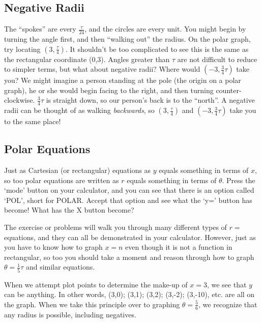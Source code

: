 
\subsection{Negative Radii}
The ``spokes'' are every $\frac{\tau}{24}$, and the circles are every unit.  You might begin by turning
the angle first, and then ``walking out'' the radius.  On the polar graph, try locating $(3,\frac{\tau}{4})$.
It shouldn't be too complicated to see this is the same as the rectangular coordinate (0,3).  Angles
greater than $\tau$ are not difficult to reduce to simpler terms, but what about negative radii?  
Where would $(-3,\frac{3}{4}\tau)$ take you?  We might imagine a person standing at the
pole (the origin on a polar graph), he or she would begin facing to the right, and then turning 
counter-clockwise.  $\frac{3}{4}\tau$ is straight down, so our person's back is to the ``north''.  A
negative radii can be thought of as walking \emph{backwards}, so $(3,\frac{\tau}{4})$ and
$(-3,\frac{3}{4}\tau)$ take you to the same place!


\subsection{Polar Equations}
Just as Cartesian (or rectangular) equations as $y$ equals something in terms of $x$, so
too polar equations are written as $r$ equals something in terms of $\theta$.  Press the `mode'
button on your calculator, and you can see that there is an option called `POL', short for POLAR.
Accept that option and see what the `y=' button has become!  What has the X button become?

The exercise or problems will walk you through many different types of $r=$ equations, and they
can all be demonstrated in your calculator.  However, just as you have to know how to graph
$x=n$ even though it is not a function in rectangular, so too you should take a moment and reason
through how to graph $\theta=\frac{1}{5}\tau$ and similar equations. 

When we attempt plot points to determine the make-up of $x=3$, we see that $y$ can be anything.
In other words, (3,0); (3,1); (3,2); (3,-2); (3,-10), etc. are all on the graph.  When we take this principle
over to graphing $\theta=\frac{5}{6}$, we recognize that any radius is possible, including negatives.
~\vfill
